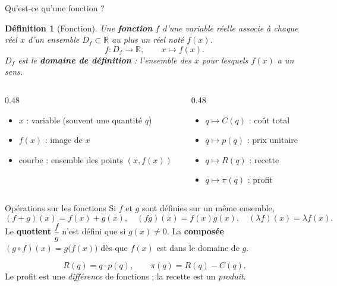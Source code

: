 \documentclass[10pt,aspectratio=169]{beamer}
\newcounter{dummy}
\numberwithin{dummy}{section}
\newtheorem{mydef}[dummy]{Définition}
\newcommand{\R}{\mathbb{R}}
\newcommand{\CT}{C}
\newcommand{\Rec}{R}
\newcommand{\Prof}{\pi}
\begin{document}
\begin{frame}{Qu'est-ce qu'une fonction ?}
\begin{mydef}[Fonction]
Une \textbf{fonction} $f$ d'une variable réelle associe à chaque réel $x$ d'un ensemble $D_f\subset\R$ \emph{au plus un} réel noté $f(x)$.
\[
f : D_f \longrightarrow \R, \qquad x \longmapsto f(x).
\]
$D_f$ est le \textbf{domaine de définition} : l'ensemble des $x$ pour lesquels $f(x)$ a un sens.
\end{mydef}

\vspace{0.3em}
\begin{columns}[T]
\begin{column}{0.48\textwidth}
\begin{boxsynthese}[Vocabulaire]
\begin{itemize}
    \item $x$ : variable (souvent une quantité $q$)
    \item $f(x)$ : image de $x$
    \item courbe : ensemble des points $(x,f(x))$
\end{itemize}
\end{boxsynthese}
\end{column}
\begin{column}{0.48\textwidth}
\begin{boxgestion}[Traduction]
\begin{itemize}
    \item $q \mapsto \CT(q)$ : coût total
    \item $q \mapsto p(q)$ : prix unitaire
    \item $q \mapsto \Rec(q)$ : recette
    \item $q \mapsto \Prof(q)$ : profit
\end{itemize}
\end{boxgestion}
\end{column}
\end{columns}
\end{frame}

\begin{frame}{Opérations sur les fonctions}
Si $f$ et $g$ sont définies sur un même ensemble,
\[
(f+g)(x)=f(x)+g(x),\quad
(fg)(x)=f(x)g(x),\quad
(\lambda f)(x)=\lambda f(x).
\]
Le \textbf{quotient} $\dfrac{f}{g}$ n'est défini que si $g(x)\neq 0$.
La \textbf{composée} $(g\circ f)(x)=g\bigl(f(x)\bigr)$ dès que $f(x)$ est dans le domaine de $g$.

\vspace{0.5em}
\begin{boxgestion}
\[
\Rec(q)=q\cdot p(q),\qquad
\Prof(q)=\Rec(q)-\CT(q).
\]
Le profit est une \emph{différence} de fonctions ; la recette est un \emph{produit}.
\end{boxgestion}
\end{frame}
\end{document}
